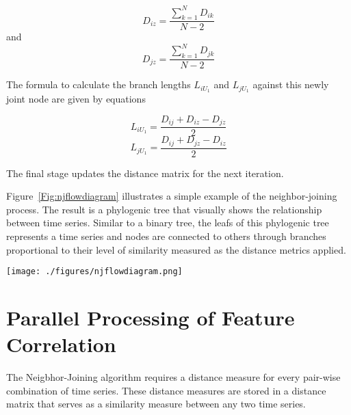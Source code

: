 $$D_{iz}=\frac{\sum\limits_{k=1}^{N} D_{ik}}{N-2}$$ and $$D_{jz}=\frac{\sum\limits_{k=1}^{N} D_{jk}}{N-2}$$


The formula to calculate the branch lengths $L_{iU_1}$ and $L_{jU_1}$ against this newly joint node are given by equations

\begin{equation}
L_{iU_1} = \frac{D_{ij}+D_{iz}-D_{jz}}{2}
\end{equation}
$$L_{jU_1} = \frac{D_{ij}+D_{jz}-D_{iz}}{2}$$

The final stage updates the distance matrix for the next iteration. 


Figure~\ref{Fig:njflowdiagram} illustrates a simple example of the neighbor-joining process. The result is a phylogenic tree that visually shows the relationship between time series. Similar to a binary tree, the leafs of this phylogenic tree represents a time series and nodes are connected to others through branches proportional to their level of similarity measured as the distance metrics applied.

\begin{figure*}
	\begin{center}
	\texttt{[image: ./figures/njflowdiagram.png]}
	\caption{Neighbor-Joining example on arbitrary distance matrix. In iteration 1, the phylogenic tree initializes all the nodes with equal distances. The Q matrix is computed from the inital distance matrix, where time series $a$ and $b$  are identified as the closest nodes. These nodes are joined as node $u$. Their branch length are calculated and the distance matrix is updated. In iteration 2, time series $c$  and $u$ are joined as node $v$. Their branch length are calculated and the distance matrix is updated. In iteration 3, branch node $v$ and timeseries $d$ are joined as node $w$ and their branch length are calculated. The distance between $w$ and $e$ is finalliy calculated.} \label{Fig:njflowdiagram}
	\end{center}

\end{figure*}


\section{Parallel Processing of Feature Correlation}\label{subsec:feature_correlation}
The Neigbhor-Joining algorithm requires a distance measure for
every pair-wise combination of time series. These distance measures are stored in a 
distance matrix that serves as a similarity measure between any two time series. 

